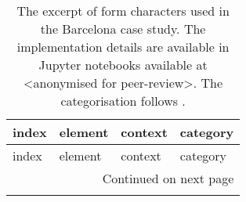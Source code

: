 \small
\begin{longtable}{p{5cm}p{4cm}p{4cm}l}
\caption{The excerpt of form characters used in the Barcelona case study. The implementation details are available
in Jupyter notebooks available at <anonymised for peer-review>. The categorisation follows \cite{fleischmann2020measuring}.}
\label{tab:bcn_form_excerpt} \\
\toprule
                               index &                         element &                    context &     category \\
\midrule
\endfirsthead

\toprule
                               index &                         element &                    context &     category \\
\midrule
\endhead
\midrule
\multicolumn{4}{r}{{Continued on next page}} \\
\midrule
\endfoot


\end{longtable}

